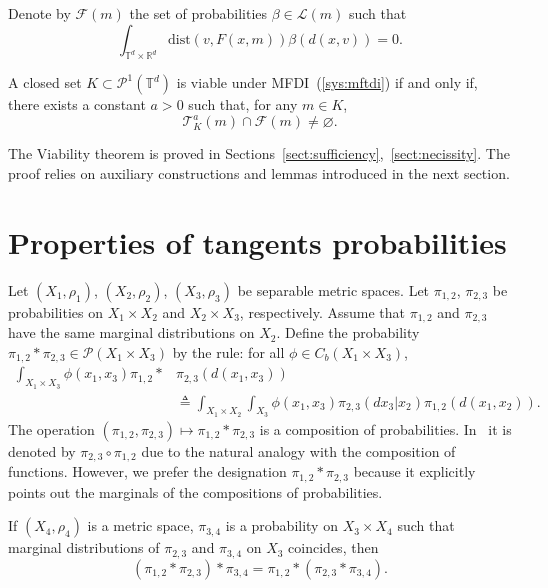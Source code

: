 \documentclass[12pt]{article}
\newcommand{\ptd}{\mathcal{P}^1(\mathbb{T}^d)}
\newcommand{\inttrd}{\int_{\mathbb{T}^d\times \mathbb{R}^d}}
\begin{document}
Denote by $\mathcal{F}(m)$ the set of probabilities $\beta\in\mathcal{L}(m)$ such that 
$$\inttrd\mathrm{dist}(v,F(x,m))\beta(d(x,v))=0. $$

\begin{theorem}\label{th:viability}
	A closed set $K\subset \ptd$ is viable under MFDI~(\ref{sys:mftdi}) if and only if, there exists a constant $a>0$ such that, for any $m\in K$, \begin{equation}\label{prop:nonemptyness}
	\mathcal{T}_K^a(m)\cap\mathcal{F}(m)\neq\varnothing. 
	\end{equation}
\end{theorem}
The  Viability theorem is proved in Sections~\ref{sect:sufficiency},~\ref{sect:necissity}. The proof relies on auxiliary constructions and lemmas introduced in the next section.




\section{Properties of tangents probabilities}\label{sec:lemmas}
Let $(X_1,\rho_1)$, $(X_2,\rho_2)$, $(X_3,\rho_3)$ be separable metric spaces. Let $\pi_{1,2}$, $\pi_{2,3}$ be probabilities on $X_1\times X_2$ and $X_2\times X_3$, respectively. Assume that $\pi_{1,2}$ and $\pi_{2,3}$ have the same  marginal distributions on $X_2$. 
Define the probability $\pi_{1,2}*\pi_{2,3}\in\mathcal{P}(X_1\times X_3)$ by the rule: for all $\phi\in C_b(X_1\times X_3)$,
\begin{equation*}\begin{split} 
\int_{X_1\times X_3}\phi(x_1,x_3)\pi_{1,2}*&\pi_{2,3}(d(x_1,x_3)) \\ 
&\triangleq \int_{X_1\times X_2}\int_{X_3}\phi(x_1,x_3)\pi_{2,3}(dx_3|x_2)\pi_{1,2}(d(x_1,x_2)). 
\end{split}\end{equation*}
The operation $(\pi_{1,2},\pi_{2,3})\mapsto \pi_{1,2}*\pi_{2,3}$ is a composition of probabilities. In~\cite{Ambrosio} it is denoted by $\pi_{2,3}\circ\pi_{1,2}$ due to the natural analogy with the composition of functions. However, we prefer the designation $\pi_{1,2}*\pi_{2,3}$ because it explicitly points out  the marginals of the compositions of probabilities.




\begin{remark} If $(X_4,\rho_4)$ is a metric space, $\pi_{3,4}$ is a probability on $X_3\times X_4$ such that marginal distributions of $\pi_{2,3}$ and $\pi_{3,4}$ on $X_3$ coincides, then
	$$(\pi_{1,2}*\pi_{2,3})*\pi_{3,4}=\pi_{1,2}*(\pi_{2,3}*\pi_{3,4}). $$
\end{remark}
\end{document}
